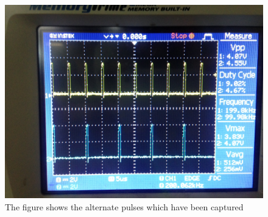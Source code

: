 \documentclass{article}
\begin{document}
\begin{figure}[h]
	\centering
	\includegraphics[scale = 0.4]{images/Selected_pulses.JPG}
	\caption{The figure shows the alternate pulses which have been captured}
	\label{Fig :1b}
\end{figure}
\end{document}

